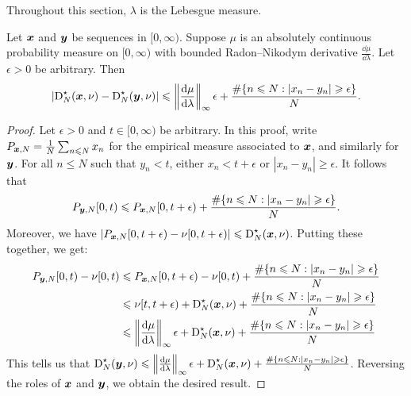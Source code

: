 Throughout this section, $\lambda$ is the Lebesgue measure. 

\begin{lemma}\label{lem:disc-of-two-seq}
Let ${\boldsymbol x}$ and ${\boldsymbol y}$ be sequences in $[0,\infty)$. Suppose $\mu$ is an 
absolutely continuous probability measure on $[0,\infty)$ with bounded 
Radon--Nikodym derivative $\frac{\dd \mu}{\dd\lambda}$. Let $\epsilon>0$ be 
arbitrary. Then 
\[
	\left|\operatorname{D}_N^\star({\boldsymbol x}, \nu) - \operatorname{D}_N^\star({\boldsymbol y},\nu)\right| \leqslant \left\|\frac{\mathrm{d}\mu}{\mathrm{d}\lambda}\right\|_\infty \epsilon + \frac{\#\{ n\leqslant N : |x_n - y_n| \geqslant \epsilon\}}{N} .
\]
\end{lemma}
\begin{proof}
Let $\epsilon>0$ and $t\in [0,\infty)$ be arbitrary. In this proof, write 
$P_{{\boldsymbol x},N} = \frac 1 N \sum_{n\leqslant N} x_n$ for the empirical measure 
associated to ${\boldsymbol x}$, and similarly for ${\boldsymbol y}$. For all $n\leqslant N$ 
such that $y_n<t$, either $x_n < t+\epsilon$ or 
$|x_n - y_n| \geqslant \epsilon$. It follows that 
\[
	P_{{\boldsymbol y},N}[0,t) \leqslant P_{{\boldsymbol x},N}[0,t+\epsilon) + \frac{\#\{ n\leqslant N : |x_n - y_n| \geqslant \epsilon\}}{N} .
\]
Moreover, we have 
$\left| P_{{\boldsymbol x},N}[0,t+\epsilon) - \nu[0,t+\epsilon)\right| \leqslant \operatorname{D}_N^\star({\boldsymbol x},\nu)$. Putting these together, we get: 
\begin{align*}
	P_{{\boldsymbol y},N}[0,t) - \nu[0,t) 
		&\leqslant P_{{\boldsymbol x},N}[0,t+\epsilon) - \nu[0,t) + \frac{\#\{ n\leqslant N : |x_n - y_n| \geqslant \epsilon\}}{N} \\
		&\leqslant \nu[t,t+\epsilon) + \operatorname{D}_N^\star({\boldsymbol x},\nu) + \frac{\#\{ n\leqslant N : |x_n - y_n| \geqslant \epsilon\}}{N} \\
		&\leqslant \left\|\frac{\mathrm{d}\mu}{\mathrm{d}\lambda}\right\|_\infty \epsilon + \operatorname{D}_N^\star({\boldsymbol x},\nu) + \frac{\#\{ n\leqslant N : |x_n - y_n| \geqslant \epsilon\}}{N} 
\end{align*}
This tells us that 
$\operatorname{D}_N^\star({\boldsymbol y},\nu) \leqslant \left\|\frac{\mathrm{d}\mu}{\mathrm{d}\lambda}\right\|_\infty \epsilon + \operatorname{D}_N^\star({\boldsymbol x},\nu) + \frac{\#\{ n\leqslant N : |x_n - y_n| \geqslant \epsilon\}}{N}$. 
Reversing the roles of ${\boldsymbol x}$ and ${\boldsymbol y}$, we obtain the desired result. 
\end{proof}

